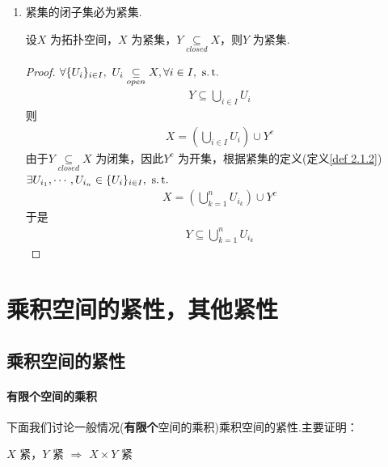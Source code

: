 \begin{enumerate}
		\vspace*{2em}
		\item 紧集的闭子集必为紧集.
		\begin{proposition}
			设$X$ 为拓扑空间，$X$ 为紧集，$Y \underset{closed}{\subseteq} X$，则$Y$ 为紧集.
			\begin{proof}
				$\forall \{ U_i \}_{i \in I} , \,\, U_i \underset{open}{\subseteq} X , \forall i \in I , \,\, \operatorname{s.t.}$
				\begin{align}
					Y \subseteq \bigcup_{i \in I}{U_i}
				\end{align}
				则
				\begin{align}
					X = (\bigcup_{i \in I}{U_i}) \cup Y^c
				\end{align}
				由于$Y \underset{closed}{\subseteq} X$ 为闭集，因此$Y^c$ 为开集，根据紧集的定义(定义\ref{def 2.1.2})\\
				$\exists U_{i_1} , \cdots , U_{i_n} \in \{ U_i \}_{i \in I} , \,\, \operatorname{s.t.}$
				\begin{align}
					X = (\bigcup_{k = 1}^{n}{U_{i_k}}) \cup Y^c
				\end{align}
				于是
				\begin{align}
					Y \subseteq \bigcup_{k = 1}^{n}{U_{i_k}}
				\end{align}
			\end{proof}
		\end{proposition}
	\end{enumerate}

\newpage
\section{乘积空间的紧性，其他紧性}
\subsection{乘积空间的紧性}
\paragraph{有限个空间的乘积}
	下面我们讨论一般情况(\textbf{有限个}空间的乘积)乘积空间的紧性.主要证明：
	\begin{center}
		$X$ 紧，$Y$ 紧 $\Rightarrow$ $X \times Y$ 紧
	\end{center}

